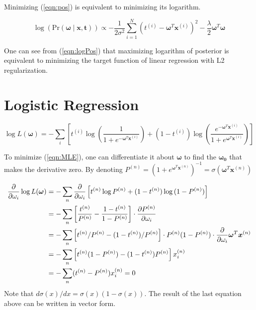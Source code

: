 \documentclass[12pt]{article}
\begin{document}
Minimizing (\ref{eqn:pos}) is equivalent to minimizing its logarithm.

\begin{equation}
    \log\left(\text{Pr}(\boldsymbol{\omega}\;|\;\boldsymbol{x},\boldsymbol{t})\right) \propto -\frac{1}{2\sigma^2}\sum_{i=1}^N\left(t^{(i)} - \boldsymbol{\omega}^T\boldsymbol{x}^{(i)}\right)^2 - \frac{\lambda}{2}\boldsymbol{\omega}^T\boldsymbol{\omega}
    \label{eqn:logPos}
\end{equation}

One can see from (\ref{eqn:logPos}) that maximizing logarithm of posterior is equivalent to minimizing the target function of linear regression with L2 regularization.

\section{Logistic Regression}
\begin{equation}
    \log{L(\boldsymbol{\omega})} = -\sum_i\left[ t^{(i)}\log{\left(\frac{1}{1+e^{-\boldsymbol{\omega}^T\boldsymbol{x}^{(i)}}}\right)} + (1-t^{(i)})\log\left(\frac{e^{-\boldsymbol{\omega}^T\boldsymbol{x}^{(i)}}}{1+e^{\boldsymbol{\omega}^T\boldsymbol{x}^{(i)}}}\right)\right]
    \label{eqn:MLE}
\end{equation}

To minimize (\ref{eqn:MLE}), one can differentiate it about $\boldsymbol{\omega}$ to find the $\boldsymbol{\omega_0}$ that makes the derivative zero. By denoting $P^{(n)} = ({1+e^{\boldsymbol{\omega}^T \boldsymbol{x}^{(n)}}})^{-1} = \sigma(\boldsymbol{\omega}^T\boldsymbol{x}^{(n)})$


\begin{align*}
    {\partial \over \partial \omega_i}\log{L(\boldsymbol{\omega})} &= -\sum_n{\partial \over \partial \omega_i}\left[t^{(n)}\log{P^{(n)}} + (1-t^{(n)})\log{(1-P^{(n)})}\right] \\ &= - \sum_n\left[\frac{t^{(n)}}{{P^{(n)}}} - \frac{1-t^{(n)}}{1-P^{(n)}}\right]\cdot {\partial P^{(n)} \over \partial \omega_i} \\ &= -\sum_n\left[t^{(n)}/P^{(n)} - (1-t^{(n)})/P^{(n)}\right]\cdot P^{(n)}(1-P^{(n)})\cdot {\partial \over \partial \omega_i} \boldsymbol{\omega}^T\boldsymbol{x}^{(n)} \\ &= -\sum_n\left[t^{(n)}(1-P^{(n)}) - (1-t^{(n)})P^{(n)} \right]x_i^{(n)} \\ &= - \sum_n(t^{(n)} - P^{(n)})x_i^{(n)} = 0
\end{align*}
Note that ${d\sigma(x)/ dx} = \sigma(x)(1-\sigma(x))$.
The result of the last equation above can be written in vector form.
\end{document}
